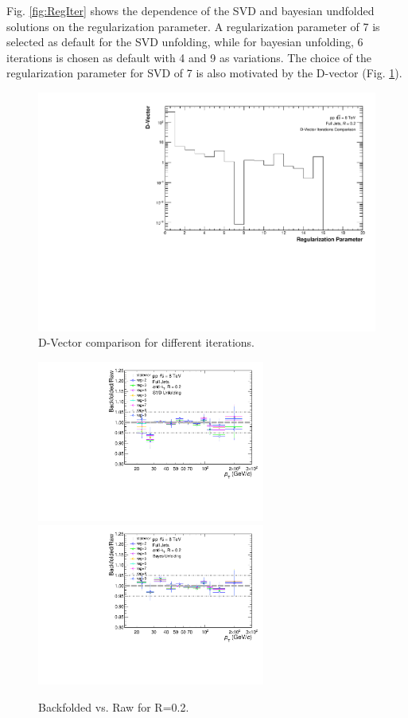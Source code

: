 \documentclass[ALICE]{ALICE_analysis_notes}
\begin{document}
Fig. \ref{fig:RegIter} shows the dependence of the SVD and bayesian undfolded solutions on the regularization parameter. A regularization parameter of 7 is selected as default for the SVD unfolding, while for bayesian unfolding, 6 iterations is chosen as default with 4 and 9 as variations. The choice of the regularization parameter for SVD of 7 is also motivated by the D-vector (Fig. \ref{fig:DVector}). 

\begin{figure}
    \centering
    \includegraphics[width=15cm]{figures/DVector/DVector_R02.pdf}
    \caption{D-Vector comparison for different iterations.}
    \label{fig:DVector}
\end{figure}

\begin{figure}
    \centering
    \begin{multicols}{2}
        \includegraphics[width=7.5cm]{figures/UnfoldingComparisons/BackfoldedVsRaw/RatioFoldRawSvd_R02.pdf}
    \vfill\null
    \columnbreak
        \includegraphics[width=7.5cm]{figures/UnfoldingComparisons/BackfoldedVsRaw/RatioFoldRawBayes_R02.pdf}
        \vfill\null
    \end{multicols}
    \caption{Backfolded vs. Raw for R=0.2.}
    \label{fig:BackfoldedRaw}
\end{figure}
\end{document}
